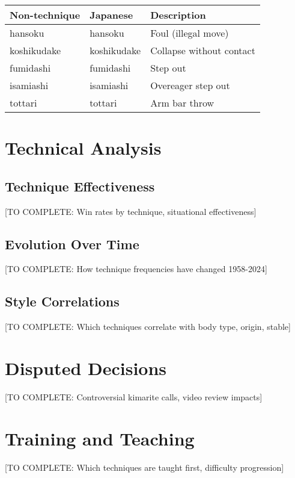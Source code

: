 \begin{longtable}{lll}
\toprule
Non-technique & Japanese & Description \\
\midrule
hansoku & hansoku & Foul (illegal move) \\
koshikudake & koshikudake & Collapse without contact \\
fumidashi & fumidashi & Step out \\
isamiashi & isamiashi & Overeager step out \\
tottari & tottari & Arm bar throw \\
\bottomrule
\end{longtable}

\section{Technical Analysis}

\subsection{Technique Effectiveness}

[TO COMPLETE: Win rates by technique, situational effectiveness]

\subsection{Evolution Over Time}

[TO COMPLETE: How technique frequencies have changed 1958-2024]

\subsection{Style Correlations}

[TO COMPLETE: Which techniques correlate with body type, origin, stable]

\section{Disputed Decisions}

[TO COMPLETE: Controversial kimarite calls, video review impacts]

\section{Training and Teaching}

[TO COMPLETE: Which techniques are taught first, difficulty progression]